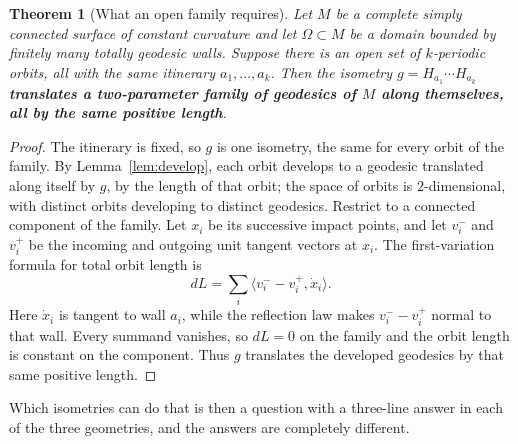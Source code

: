 \documentclass[11pt,a4paper]{article}
\theoremstyle{plain}
\newtheorem{theorem}{Theorem}[section]
\theoremstyle{definition}
\theoremstyle{remark}
\begin{document}
\begin{theorem}[What an open family requires]\label{thm:translate}
Let $M$ be a complete simply connected surface of constant curvature and let
$\Omega\subset M$ be a domain bounded by finitely many \emph{totally geodesic}
walls. Suppose there is an open set of $k$-periodic orbits, all with the same
itinerary $a_1,\dots,a_k$. Then the isometry $g=H_{a_1}\cdots H_{a_k}$
\textbf{translates a two-parameter family of geodesics of $M$ along themselves, all
by the same positive length}.
\end{theorem}

\begin{proof}
The itinerary is fixed, so $g$ is one isometry, the same for every orbit of the
family. By Lemma~\ref{lem:develop}, each orbit develops to a geodesic translated
along itself by $g$, by the length of that orbit; the space of orbits is
$2$-dimensional, with distinct orbits developing to distinct geodesics.
Restrict to a connected component of the family. Let $x_i$ be its successive
impact points, and let $v_i^-$ and $v_i^+$ be the incoming and outgoing unit
tangent vectors at $x_i$. The first-variation formula for total orbit length is
\[
 dL=\sum_i\langle v_i^- -v_i^+,\dot x_i\rangle.
\]
Here $\dot x_i$ is tangent to wall $a_i$, while the reflection law makes
$v_i^- -v_i^+$ normal to that wall. Every summand vanishes, so $dL=0$ on the
family and the orbit length is constant on the component. Thus $g$ translates the
developed geodesics by that same positive length.
\end{proof}

Which isometries can do that is then a question with a three-line answer in each of
the three geometries, and the answers are completely different.
\end{document}
